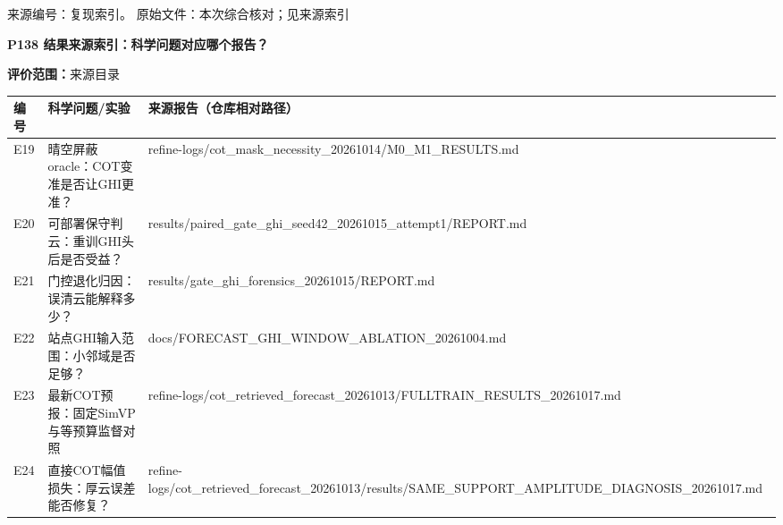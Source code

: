 \documentclass[UTF8,a4paper,landscape,10pt]{ctexart}
\begin{document}
\vfill{\scriptsize\color{muted} 来源编号：复现索引。 原始文件：本次综合核对；见来源索引}\par
\clearpage
{\large\bfseries\color{ink} P138  结果来源索引：科学问题对应哪个报告？}\par
{}\par
{\small\color{muted}\textbf{评价范围：}来源目录}\par\vspace{3mm}
\begin{center}\small
\begin{adjustbox}{max totalheight=0.58\textheight,max width=\linewidth}
\begin{minipage}{\linewidth}\begin{tabularx}{\linewidth}{>{\hsize=0.3000\hsize\raggedright\arraybackslash}X>{\hsize=0.9000\hsize\raggedright\arraybackslash}X>{\hsize=1.8000\hsize\raggedright\arraybackslash}X}\toprule
\textbf{编号} & \textbf{科学问题/\allowbreak{}实验} & \textbf{来源报告（仓库相对路径）} \\ \midrule
E19 & 晴空屏蔽oracle：COT变准是否让GHI更准？ & refine-logs/\allowbreak{}cot\_\allowbreak{}mask\_\allowbreak{}necessity\_\allowbreak{}20261014/\allowbreak{}M0\_\allowbreak{}M1\_\allowbreak{}RESULTS.md \\
E20 & 可部署保守判云：重训GHI头后是否受益？ & results/\allowbreak{}paired\_\allowbreak{}gate\_\allowbreak{}ghi\_\allowbreak{}seed42\_\allowbreak{}20261015\_\allowbreak{}attempt1/\allowbreak{}REPORT.md \\
E21 & 门控退化归因：误清云能解释多少？ & results/\allowbreak{}gate\_\allowbreak{}ghi\_\allowbreak{}forensics\_\allowbreak{}20261015/\allowbreak{}REPORT.md \\
E22 & 站点GHI输入范围：小邻域是否足够？ & docs/\allowbreak{}FORECAST\_\allowbreak{}GHI\_\allowbreak{}WINDOW\_\allowbreak{}ABLATION\_\allowbreak{}20261004.md \\
E23 & 最新COT预报：固定SimVP与等预算监督对照 & refine-logs/\allowbreak{}cot\_\allowbreak{}retrieved\_\allowbreak{}forecast\_\allowbreak{}20261013/\allowbreak{}FULLTRAIN\_\allowbreak{}RESULTS\_\allowbreak{}20261017.md \\
E24 & 直接COT幅值损失：厚云误差能否修复？ & refine-logs/\allowbreak{}cot\_\allowbreak{}retrieved\_\allowbreak{}forecast\_\allowbreak{}20261013/\allowbreak{}results/\allowbreak{}SAME\_\allowbreak{}SUPPORT\_\allowbreak{}AMPLITUDE\_\allowbreak{}DIAGNOSIS\_\allowbreak{}20261017.md \\

\end{tabularx}
\end{minipage}
\end{adjustbox}
\end{center}
\end{document}
